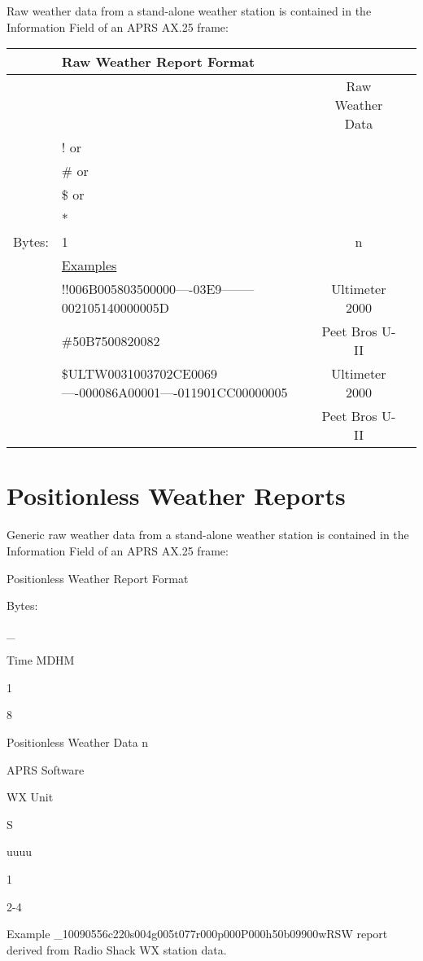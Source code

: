 Raw weather data from a stand-alone weather station is contained in the
Information Field of an APRS AX.25 frame:


\begin{tabular}{|l|l|c|r|}
  \hline
  & Raw Weather Report Format & & \\
  \hline
  & & Raw Weather Data & \\
  & ! or & & \\
  & \# or & & \\
  & \$ or & & \\
  & * & & \\
  \hline 
  Bytes: & 1 & n  & \\
  \hline
  & \underline{Examples} & & \\
  & !!006B005803500000----03E9--------002105140000005D &  Ultimeter 2000 &  \\
  & \#50B7500820082 &  Peet Bros U-II & \\
  & \$ULTW0031003702CE0069----000086A00001----011901CC00000005 &  Ultimeter 2000 & \\
  & \*7007600000000 & Peet Bros U-II & \\
  \hline
  
\end{tabular}





\section{Positionless Weather Reports}

Generic raw weather data from a stand-alone weather station is contained in
the Information Field of an APRS AX.25 frame:

Positionless Weather Report Format

Bytes:

_

Time
MDHM

1

8

Positionless Weather
Data
n

APRS
Software

WX
Unit

S

uuuu

1

2-4

Example
_10090556c220s004g005t077r000p000P000h50b09900wRSW
report derived from Radio Shack WX station data.

